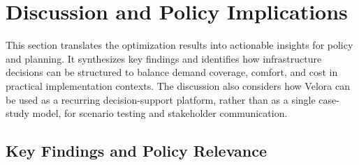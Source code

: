 \documentclass[preprint,authoryear,10pt]{elsarticle}
\begin{document}

\section{Discussion and Policy Implications}
\label{policy}

This section translates the optimization results into actionable insights for policy and planning. It synthesizes key findings and identifies how infrastructure decisions can be structured to balance demand coverage, comfort, and cost in practical implementation contexts. The discussion also considers how Velora can be used as a recurring decision-support platform, rather than as a single case-study model, for scenario testing and stakeholder communication.

\subsection{Key Findings and Policy Relevance}
\end{document}
